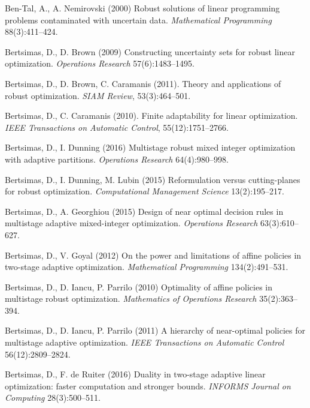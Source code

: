 \documentclass[fleqn,mnsc,blindrev]{informs4}
\begin{document}
\begin{thebibliography}{}
			Ben-Tal, A., A. Nemirovski (2000)
			Robust solutions of linear programming problems contaminated with uncertain data. {\it Mathematical Programming} 88(3):411--424.
			
			
			Bertsimas, D., D. Brown (2009)
			Constructing uncertainty sets for robust linear optimization. {\it Operations Research} 57(6):1483--1495.
			
			Bertsimas, D.,  D. Brown,  C. Caramanis (2011).
			Theory and applications of robust optimization. {\it SIAM Review}, 53(3):464--501.
			
			
			Bertsimas, D.,   C. Caramanis (2010).
			Finite adaptability for linear optimization. {\it IEEE Transactions on Automatic Control}, 55(12):1751--2766.
			
			Bertsimas, D., I. Dunning (2016)
			Multistage robust mixed integer optimization with adaptive partitions.  {\it Operations Research} 64(4):980--998.

			Bertsimas, D., I. Dunning, M. Lubin (2015)
			Reformulation versus cutting-planes for robust optimization.  {\it Computational Management Science} 13(2):195--217.
			
			
			Bertsimas, D., A. Georghiou (2015)
			Design of near optimal decision rules in multistage adaptive mixed-integer
			optimization. {\it Operations Research} 63(3):610--627.		
			
			Bertsimas, D., V. Goyal (2012)
			On the power and limitations of affine policies in two-stage adaptive optimization. {\it   Mathematical Programming} 134(2):491--531.
			
			Bertsimas, D., D. Iancu, P. Parrilo (2010)
			Optimality of affine policies in multistage robust optimization.  {\it Mathematics of Operations Research} 35(2):363--394.
			
			Bertsimas, D., D. Iancu, P. Parrilo (2011)
			A hierarchy of near-optimal policies for multistage adaptive optimization. {\it IEEE Transactions on Automatic Control} 56(12):2809--2824.
			
			
			Bertsimas, D.,  F. de Ruiter (2016)
			Duality in two-stage adaptive linear optimization: faster computation and stronger bounds. {\it  INFORMS Journal on Computing} 28(3):500--511.
			

\end{thebibliography}
\end{document}
